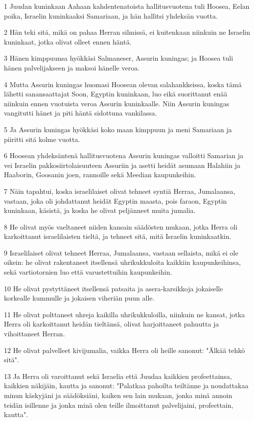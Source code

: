 \par 1 Juudan kuninkaan Aahaan kahdentenatoista hallitusvuotena tuli Hoosea, Eelan poika, Israelin kuninkaaksi Samariaan, ja hän hallitsi yhdeksän vuotta.
\par 2 Hän teki sitä, mikä on pahaa Herran silmissä, ei kuitenkaan niinkuin ne Israelin kuninkaat, jotka olivat olleet ennen häntä.
\par 3 Hänen kimppuunsa hyökkäsi Salmaneser, Assurin kuningas; ja Hoosea tuli hänen palvelijakseen ja maksoi hänelle veroa.
\par 4 Mutta Assurin kuningas huomasi Hoosean olevan salahankkeissa, koska tämä lähetti sanansaattajat Soon, Egyptin kuninkaan, luo eikä suorittanut enää niinkuin ennen vuotuista veroa Assurin kuninkaalle. Niin Assurin kuningas vangitutti hänet ja piti häntä sidottuna vankilassa.
\par 5 Ja Assurin kuningas hyökkäsi koko maan kimppuun ja meni Samariaan ja piiritti sitä kolme vuotta.
\par 6 Hoosean yhdeksäntenä hallitusvuotena Assurin kuningas valloitti Samarian ja vei Israelin pakkosiirtolaisuuteen Assuriin ja asetti heidät asumaan Halahiin ja Haaborin, Goosanin joen, rannoille sekä Meedian kaupunkeihin.
\par 7 Näin tapahtui, koska israelilaiset olivat tehneet syntiä Herraa, Jumalaansa, vastaan, joka oli johdattanut heidät Egyptin maasta, pois faraon, Egyptin kuninkaan, käsistä, ja koska he olivat peljänneet muita jumalia.
\par 8 He olivat myös vaeltaneet niiden kansain säädösten mukaan, jotka Herra oli karkoittanut israelilaisten tieltä, ja tehneet sitä, mitä Israelin kuninkaatkin.
\par 9 Israelilaiset olivat tehneet Herraa, Jumalaansa, vastaan sellaista, mikä ei ole oikein: he olivat rakentaneet itsellensä uhrikukkuloita kaikkiin kaupunkeihinsa, sekä vartiotornien luo että varustettuihin kaupunkeihin.
\par 10 He olivat pystyttäneet itsellensä patsaita ja asera-karsikkoja jokaiselle korkealle kummulle ja jokaisen viheriän puun alle.
\par 11 He olivat polttaneet uhreja kaikilla uhrikukkuloilla, niinkuin ne kansat, jotka Herra oli karkoittanut heidän tieltänsä, olivat harjoittaneet pahuutta ja vihoittaneet Herran.
\par 12 He olivat palvelleet kivijumalia, vaikka Herra oli heille sanonut: "Älkää tehkö sitä".
\par 13 Ja Herra oli varoittanut sekä Israelia että Juudaa kaikkien profeettainsa, kaikkien näkijäin, kautta ja sanonut: "Palatkaa pahoilta teiltänne ja noudattakaa minun käskyjäni ja säädöksiäni, kaiken sen lain mukaan, jonka minä annoin teidän isillenne ja jonka minä olen teille ilmoittanut palvelijaini, profeettain, kautta".
